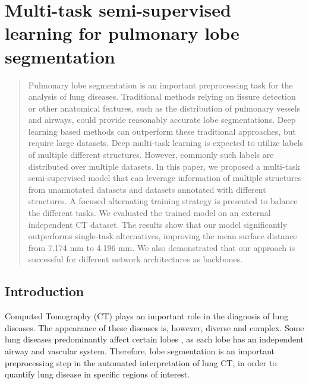 \graphicspath{{chapter2/figures/}}
\chapter{Multi-task semi-supervised learning for pulmonary lobe segmentation}
\label{chap:2}




\ThumbIndexShow



\begin{abstract}%

Pulmonary lobe segmentation is an important preprocessing task for the analysis of lung diseases. Traditional methods relying on fissure detection or other anatomical features, such as the distribution of pulmonary vessels and airways, could provide reasonably accurate lobe segmentations. Deep learning based methods can outperform these traditional approaches, but require large datasets. Deep multi-task learning is expected to utilize labels of multiple different structures. However, commonly such labels are distributed over multiple datasets. In this paper, we proposed a multi-task semi-supervised model that can leverage information of multiple structures from unannotated datasets and datasets annotated with different structures. A focused alternating training strategy is presented to balance the different tasks. We evaluated the trained model on an external independent CT dataset. The results show that our model significantly outperforms single-task alternatives, improving the mean surface distance from 7.174 mm to 4.196 mm. We also demonstrated that our approach is successful for different network architectures as backbones. 
\end{abstract}
\clearpage

\section{Introduction}
Computed Tomography (CT) plays an important role in the diagnosis of lung diseases. The appearance of these diseases is, however, diverse and complex. Some lung diseases predominantly affect certain lobes \cite{park2020fully}, as each lobe has an independent airway and vascular system. Therefore, lobe segmentation is an important preprocessing step in the automated interpretation of lung CT, in order to quantify lung disease in specific regions of interest.


